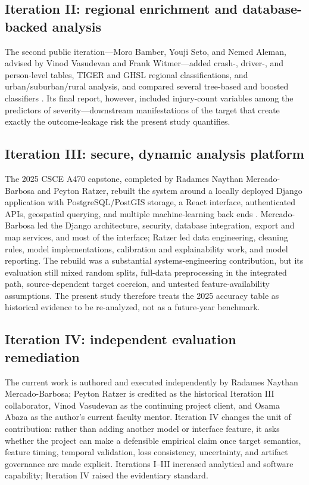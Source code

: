 \documentclass[11pt,letterpaper]{article}
\begin{document}
\subsection{Iteration II: regional enrichment and database-backed analysis}
The second public iteration---Moro Bamber, Youji Seto, and Nemed Aleman, advised by Vinod Vasudevan and Frank Witmer---added crash-, driver-, and person-level tables, TIGER and GHSL regional classifications, and urban/suburban/rural analysis, and compared several tree-based and boosted classifiers \citep{uaa2024page,bamber2024}. Its final report, however, included injury-count variables among the predictors of severity---downstream manifestations of the target that create exactly the outcome-leakage risk the present study quantifies.

\subsection{Iteration III: secure, dynamic analysis platform}
The 2025 CSCE A470 capstone, completed by Radames Naythan Mercado-Barbosa and Peyton Ratzer, rebuilt the system around a locally deployed Django application with PostgreSQL/PostGIS storage, a React interface, authenticated APIs, geospatial querying, and multiple machine-learning back ends \citep{ratzermecado2025}. Mercado-Barbosa led the Django architecture, security, database integration, export and map services, and most of the interface; Ratzer led data engineering, cleaning rules, model implementations, calibration and explainability work, and model reporting. The rebuild was a substantial systems-engineering contribution, but its evaluation still mixed random splits, full-data preprocessing in the integrated path, source-dependent target coercion, and untested feature-availability assumptions. The present study therefore treats the 2025 accuracy table as historical evidence to be re-analyzed, not as a future-year benchmark.

\subsection{Iteration IV: independent evaluation remediation}
The current work is authored and executed independently by Radames Naythan Mercado-Barbosa; Peyton Ratzer is credited as the historical Iteration III collaborator, Vinod Vasudevan as the continuing project client, and Osama Abaza as the author's current faculty mentor. Iteration IV changes the unit of contribution: rather than adding another model or interface feature, it asks whether the project can make a defensible empirical claim once target semantics, feature timing, temporal validation, loss consistency, uncertainty, and artifact governance are made explicit. Iterations I--III increased analytical and software capability; Iteration IV raised the evidentiary standard.
\end{document}
